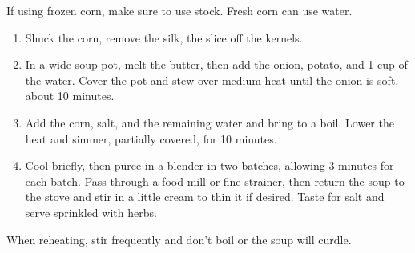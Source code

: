 
If using frozen corn, make sure to use stock.  Fresh corn can use water.

\begin{ingredients}
\end{ingredients}


\begin{recipe}
  \begin{enumerate}

  \item Shuck the corn, remove the silk, the slice off the kernels.

  \item In a wide soup pot, melt the butter, then add the onion,
    potato, and 1 cup of the water.  Cover the pot and stew over
    medium heat until the onion is soft, about 10 minutes.

  \item Add the corn, salt, and the remaining water and bring to a
    boil.  Lower the heat and simmer, partially covered, for 10
    minutes.

  \item Cool briefly, then puree in a blender in two batches, allowing
    3 minutes for each batch.  Pass through a food mill or fine
    strainer, then return the soup to the stove and stir in a little
    cream to thin it if desired.  Taste for salt and serve sprinkled
    with herbs.

  \end{enumerate}

  When reheating, stir frequently and don't boil or the soup will curdle.

\end{recipe}
